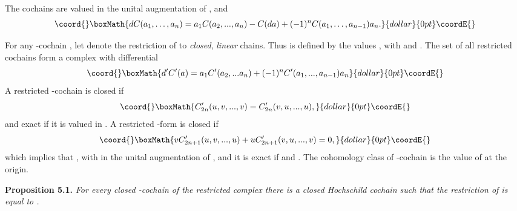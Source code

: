 \documentclass[a4paper,a4paper]{article}
\begin{document}
The cochains are valued in the unital augmentation \coordHE{} 
of \coordHE{},  and
$$\coord{}\boxMath{
dC(a_1,\ldots,a_n)= a_1C(a_2,...,a_n) - C(da) +(-1)^nC(a_1,\ldots,a_{n-1})a_n.
}{dollar}{0pt}\coordE{}$$

For any \coordHE{}-cochain \coordHE{}, let \coordHE{} denote the restriction 
of \coordHE{} to \textsl{closed}, \textsl{linear} chains.
Thus \coordHE{} is defined by the values \coordHE{}, with \coordHE{} and \coordHE{}.
The set of all restricted cochains form a complex with differential
$$\coord{}\boxMath{
d'C'(a) = a_1C'(a_2,...a_n) + (-1)^nC'(a_1,...,a_{n-1})a_n
}{dollar}{0pt}\coordE{}$$
A  restricted \coordHE{}-cochain is closed if
$$\coord{}\boxMath{ 
C'_{2n}(u,v,...,v) = C'_{2n}(v,u,...,u), 
}{dollar}{0pt}\coordE{}$$
and exact if it is valued in \coordHE{}. A restricted \coordHE{}-form is
closed if 
$$\coord{}\boxMath{
  vC'_{2n+1} (u,v,...,u) + uC'_{2n+1}(v,u,...,v) = 0,
}{dollar}{0pt}\coordE{}$$
which implies that \coordHE{},
with \coordHE{}    in the unital augmentation of \coordHE{},
and it is exact if  \coordHE{} and \coordHE{}. The
cohomology class of \coordHE{}-cochain is  the value of \coordHE{} at
the origin.

\noindent\textbf{Proposition 5.1.} \textit{
For every closed \coordHE{}-cochain \coordHE{} of the restricted complex there 
is a closed Hochschild cochain \coordHE{} such that the restriction \coordHE{} of \coordHE{} 
is equal to \coordHE{}.}
\end{document}
